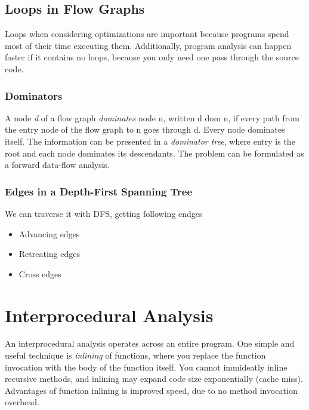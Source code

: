 \documentclass{article}
\begin{document}
\subsection{Loops in Flow Graphs} %
\label{sub:Loops in Flow Graphs}
Loops when considering optimizations are important because programs spend most of their time executing them. Additionally, program analysis can happen faster if it contains no loops, because you only need one pass through the source code.

		\subsubsection{Dominators} %
		\label{ssub:Dominators}
		A node \emph{d} of a flow graph \emph{dominates} node n, written d dom n, if every path from the entry node of the flow graph to n goes through d. Every node dominates itself. The information can be presented in a \emph{dominator tree}, where entry is the root and each node dominates its descendants. The problem can be formulated as a forward data-flow analysis.

		\subsubsection{Edges in a Depth-First Spanning Tree} %
		\label{ssub:Edges in a Depth-First Spanning Tree}	
		We can traverse it with DFS, getting following endges
		\begin{itemize}
			\item Advancing edges
			\item Retreating edges
			\item Cross edges
		\end{itemize}



\section{Interprocedural Analysis} %
\label{sec:Interprocedural Analysis}
An interprocedural analysis operates across an entire program. One simple and useful technique is \emph{inlining} of functions, where you replace the function invocation with the body of the function itself. You cannot immideatly inline recursive methods, and inlining may expand code size exponentially (cache miss). Advantages of function inlining is improved speed, due to no method invocation overhead.
\end{document}
